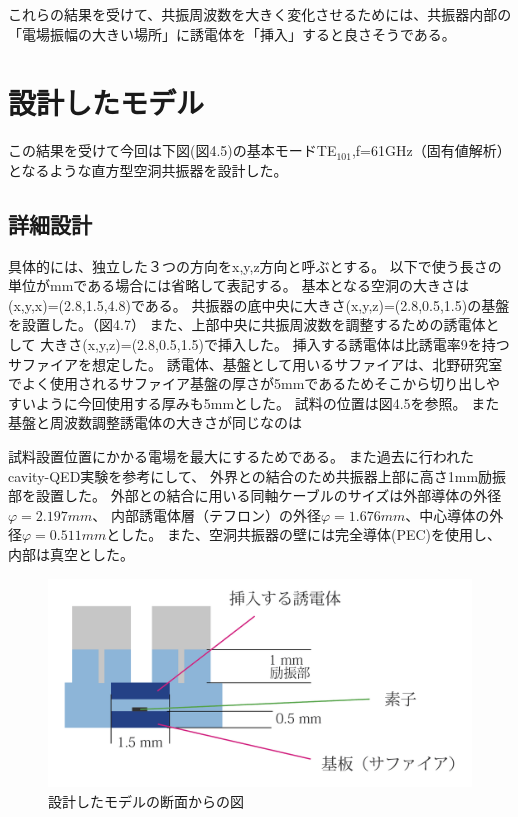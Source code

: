 これらの結果を受けて、共振周波数を大きく変化させるためには、共振器内部の「電場振幅の大きい場所」に誘電体を「挿入」すると良さそうである。

\section{設計したモデル}
この結果を受けて今回は下図(図4.5)の基本モードTE$_{101}$,f=61GHz（固有値解析）となるような直方型空洞共振器を設計した。

\subsection{詳細設計}
具体的には、独立した３つの方向をx,y,z方向と呼ぶとする。
以下で使う長さの単位がmmである場合には省略して表記する。
基本となる空洞の大きさは(x,y,x)=(2.8,1.5,4.8)である。
共振器の底中央に大きさ(x,y,z)=(2.8,0.5,1.5)の基盤を設置した。（図4.7）
また、上部中央に共振周波数を調整するための誘電体として
大きさ(x,y,z)=(2.8,0.5,1.5)で挿入した。
挿入する誘電体は比誘電率9を持つサファイアを想定した。
誘電体、基盤として用いるサファイアは、北野研究室でよく使用されるサファイア基盤の厚さが5mmであるためそこから切り出しやすいように今回使用する厚みも5mmとした。
試料の位置は図4.5を参照。
また基盤と周波数調整誘電体の大きさが同じなのは

試料設置位置にかかる電場を最大にするためである。
また過去に行われたcavity-QED実験\cite{cQED}を参考にして、
外界との結合のため共振器上部に高さ1mm励振部を設置した。
外部との結合に用いる同軸ケーブルのサイズは外部導体の外径$φ=2.197mm$、
内部誘電体層（テフロン）の外径$φ=1.676mm$、中心導体の外径$φ=0.511mm$とした。
また、空洞共振器の壁には完全導体(PEC)を使用し、内部は真空とした。

\vspace{10 mm}

\begin{figure}[h]
  \begin{center}
    \includegraphics[width=12cm]{./image/newmodel.png}
    \caption{設計したモデルの断面からの図}
    \label{fig:Cavity}
  \end{center}
\end{figure}

